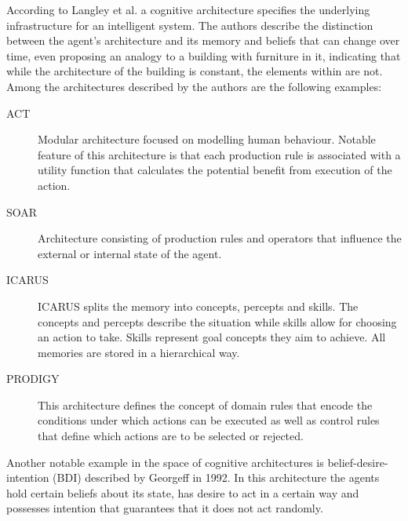 According to Langley et al.\cite{langley2009cognitive} a cognitive architecture specifies the underlying infrastructure for an intelligent system.
The authors describe the distinction between the agent's architecture and its memory and beliefs that can change over time, even proposing an analogy to a building with furniture in it, indicating that while the architecture of the building is constant, the elements within are not.
Among the architectures described by the authors are the following examples:

\begin{description}
    \item[ACT] Modular architecture focused on modelling human behaviour. Notable feature of this architecture is that each production rule is associated with a utility function that calculates the potential benefit from execution of the action.
    \item[SOAR] Architecture consisting of production rules and operators that influence the external or internal state of the agent.
    \item[ICARUS] ICARUS splits the memory into concepts, percepts and skills. The concepts and percepts describe the situation while skills allow for choosing an action to take. Skills represent goal concepts they aim to achieve. All memories are stored in a hierarchical way.
    \item[PRODIGY] This architecture defines the concept of domain rules that encode the conditions under which actions can be executed as well as control rules that define which actions are to be selected or rejected.
\end{description}

Another notable example in the space of cognitive architectures is belief-desire-intention (BDI) described by Georgeff in 1992\cite{georgeff1992abstract}.
In this architecture the agents hold certain beliefs about its state, has desire to act in a certain way and possesses intention that guarantees that it does not act randomly.

